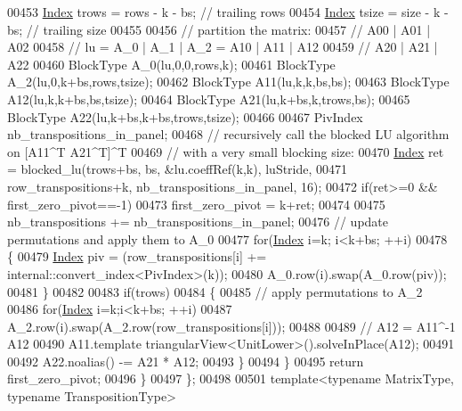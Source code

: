 \begin{DoxyCode}
00453       \hyperlink{namespace_eigen_a62e77e0933482dafde8fe197d9a2cfde}{Index} trows = rows - k - bs; \textcolor{comment}{// trailing rows}
00454       \hyperlink{namespace_eigen_a62e77e0933482dafde8fe197d9a2cfde}{Index} tsize = size - k - bs; \textcolor{comment}{// trailing size}
00455 
00456       \textcolor{comment}{// partition the matrix:}
00457       \textcolor{comment}{//                          A00 | A01 | A02}
00458       \textcolor{comment}{// lu  = A\_0 | A\_1 | A\_2 =  A10 | A11 | A12}
00459       \textcolor{comment}{//                          A20 | A21 | A22}
00460       BlockType A\_0(lu,0,0,rows,k);
00461       BlockType A\_2(lu,0,k+bs,rows,tsize);
00462       BlockType A11(lu,k,k,bs,bs);
00463       BlockType A12(lu,k,k+bs,bs,tsize);
00464       BlockType A21(lu,k+bs,k,trows,bs);
00465       BlockType A22(lu,k+bs,k+bs,trows,tsize);
00466 
00467       PivIndex nb\_transpositions\_in\_panel;
00468       \textcolor{comment}{// recursively call the blocked LU algorithm on [A11^T A21^T]^T}
00469       \textcolor{comment}{// with a very small blocking size:}
00470       \hyperlink{namespace_eigen_a62e77e0933482dafde8fe197d9a2cfde}{Index} ret = blocked\_lu(trows+bs, bs, &lu.coeffRef(k,k), luStride,
00471                    row\_transpositions+k, nb\_transpositions\_in\_panel, 16);
00472       \textcolor{keywordflow}{if}(ret>=0 && first\_zero\_pivot==-1)
00473         first\_zero\_pivot = k+ret;
00474 
00475       nb\_transpositions += nb\_transpositions\_in\_panel;
00476       \textcolor{comment}{// update permutations and apply them to A\_0}
00477       \textcolor{keywordflow}{for}(\hyperlink{namespace_eigen_a62e77e0933482dafde8fe197d9a2cfde}{Index} i=k; i<k+bs; ++i)
00478       \{
00479         \hyperlink{namespace_eigen_a62e77e0933482dafde8fe197d9a2cfde}{Index} piv = (row\_transpositions[i] += internal::convert\_index<PivIndex>(k));
00480         A\_0.row(i).swap(A\_0.row(piv));
00481       \}
00482 
00483       \textcolor{keywordflow}{if}(trows)
00484       \{
00485         \textcolor{comment}{// apply permutations to A\_2}
00486         \textcolor{keywordflow}{for}(\hyperlink{namespace_eigen_a62e77e0933482dafde8fe197d9a2cfde}{Index} i=k;i<k+bs; ++i)
00487           A\_2.row(i).swap(A\_2.row(row\_transpositions[i]));
00488 
00489         \textcolor{comment}{// A12 = A11^-1 A12}
00490         A11.template triangularView<UnitLower>().solveInPlace(A12);
00491 
00492         A22.noalias() -= A21 * A12;
00493       \}
00494     \}
00495     \textcolor{keywordflow}{return} first\_zero\_pivot;
00496   \}
00497 \};
00498 
00501 \textcolor{keyword}{template}<\textcolor{keyword}{typename} MatrixType, \textcolor{keyword}{typename} TranspositionType>

\end{DoxyCode}
